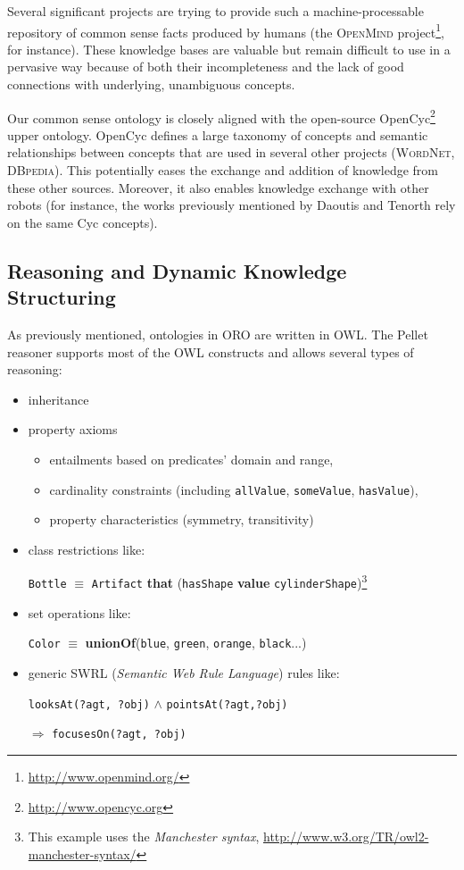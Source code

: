 \documentclass{svmult}
\newcommand{\concept}[1]{{\footnotesize \texttt{#1}}}
\begin{document}
Several significant projects are trying to provide such a machine-processable
repository of common sense facts produced by humans (the \textsc{OpenMind}
project\footnote{\url{http://www.openmind.org/}}, for instance). These
knowledge bases are valuable but remain difficult to use in a pervasive way
because of both their incompleteness and the lack of good connections with
underlying, unambiguous concepts.

Our common sense ontology is closely aligned with the open-source
OpenCyc\footnote{\url{http://www.opencyc.org}} upper ontology.
OpenCyc defines a large taxonomy of concepts and semantic
relationships between concepts that are used in several other projects
(\textsc{WordNet, DBpedia}). This potentially eases the exchange and addition
of knowledge from these other sources. Moreover, it also enables knowledge
exchange with other robots (for instance, the works previously mentioned by
Daoutis and Tenorth rely on the same Cyc concepts).

\subsection{Reasoning and Dynamic Knowledge Structuring}

As previously mentioned, ontologies in ORO are written in OWL. The
Pellet reasoner supports most of the OWL constructs and allows several types of
reasoning:

\begin{itemize}
	\item inheritance
	\item property axioms
		\begin{itemize}
		\item entailments based on predicates' domain and range,
		\item cardinality constraints (including \concept{allValue}, 
		\concept{someValue}, \concept{hasValue}),
		\item property characteristics (symmetry, transitivity)
		\end{itemize}
	\item class restrictions like: \par \footnotesize \concept{Bottle} $\equiv$
		\concept{Artifact} {\bf that} (\concept{hasShape} {\bf value}
		\concept{cylinderShape})\footnote{This example uses the \emph{Manchester
		syntax}, \url{http://www.w3.org/TR/owl2-manchester-syntax/}} \normalsize
	\item set operations like: \par \footnotesize \concept{Color} $\equiv$ {\bf unionOf}(\concept{blue},
		\concept{green}, \concept{orange}, \concept{black}...) \normalsize
	\item generic SWRL ({\em Semantic Web Rule Language}) rules like: \par
		\footnotesize \concept{looksAt(?agt, ?obj)} $\land$
		\concept{pointsAt(?agt,?obj)} \par $\Rightarrow$ \concept{focusesOn(?agt, ?obj)}
		\normalsize 
	\end{itemize}
\end{document}
